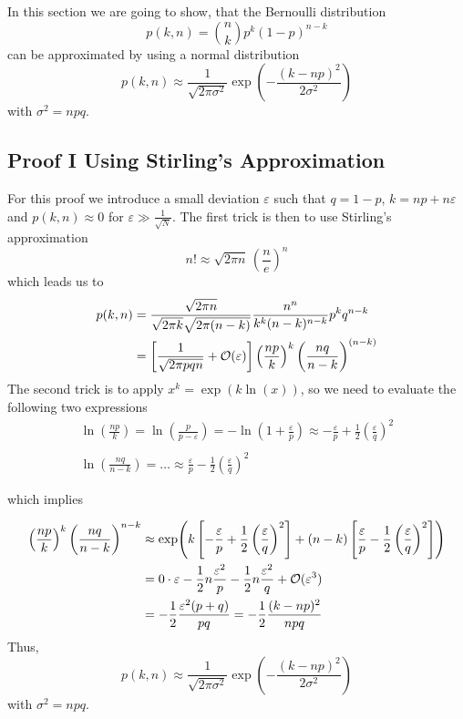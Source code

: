 \documentclass{notebook}
\begin{document}
In this section we are going to show, that the Bernoulli distribution 
%
\begin{equation}
p(k,n) = \binom{n}{k} p^k (1 - p)^{n - k}
\end{equation}
%
can be approximated by using a normal distribution
%
\begin{equation}
p(k,n) \approx \frac{1}{\sqrt{2 \pi \sigma^2}} \exp(-\frac{(k-np)^2}{2 \sigma^2})
\end{equation}
%
with $\sigma^2 = npq$.

\subsection*{Proof I Using Stirling's Approximation}

For this proof we introduce a small deviation $\varepsilon$ such that $q = 1-p$, $k = np + n \varepsilon$ and $p(k,n) \approx 0$ for $\varepsilon \gg \frac{1}{\sqrt{N}}$. The first trick is then to use Stirling's approximation 
%
\begin{equation}
n! \approx \sqrt{2\pi n} \, \left( \frac{n}{e} \right)^n
\end{equation}
%
which leads us to
%
\begin{align*}
	p(k,n) &= \frac{\sqrt{2\pi n}}{\sqrt{2\pi k}\sqrt{2\pi (n-k)}} \frac{n^n}{k^k (n-k)^{n-k}} p^k q^{n-k}  \\
	&= \left[\frac{1}{\sqrt{2 \pi p q n}} + \mathcal{O}(\varepsilon) \right] \left( \frac{np}{k} \right)^k \left( \frac{nq}{n-k} \right)^{(n-k)}	
\end{align*}
%
The second trick is to apply $x^k = \exp(k \ln(x))$, so we need to evaluate the following two expressions
%
\begin{gather*}
	\ln(\frac{np}{k}) = \ln(\frac{p}{p-\varepsilon}) = -\ln(1+\frac{\varepsilon}{p}) \approx - \frac{\varepsilon}{p} + \frac{1}{2} \left( \frac{\varepsilon}{q} \right)^2 \\ \\
	\ln(\frac{nq}{n-k}) = \hdots \approx \frac{\varepsilon}{p} - \frac{1}{2} \left( \frac{\varepsilon}{q} \right)^2
\end{gather*}
%

which implies

%
\begin{align*}
	\left( \frac{np}{k} \right)^k \left( \frac{nq}{n-k} \right)^{n-k} &\approx \exp(k \left[ - \frac{\varepsilon}{p} + \frac{1}{2} \left( \frac{\varepsilon}{q} \right)^2 \right] + (n-k) \left[ \frac{\varepsilon}{p} - \frac{1}{2} \left( \frac{\varepsilon}{q} \right)^2 \right]) \\
	&= 0 \cdot \varepsilon - \frac{1}{2} n \frac{\varepsilon^2}{p} - \frac{1}{2} n \frac{\varepsilon^2}{q} + \mathcal{O}(\varepsilon^3) \\
	&= - \frac{1}{2} \frac{\varepsilon^2(p+q)}{pq} = -\frac{1}{2} \frac{(k-np)^2}{npq}
\end{align*}
%
Thus,
%
\begin{equation}
p(k,n) \approx \frac{1}{\sqrt{2 \pi \sigma^2}} \exp(-\frac{(k-np)^2}{2 \sigma^2})
\end{equation}
%
with $\sigma^2 = npq$.
\end{document}
